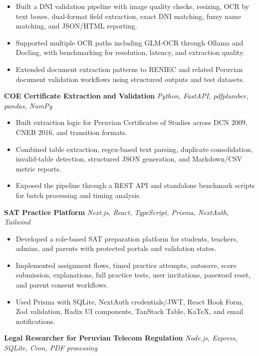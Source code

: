 \documentclass[10pt,letterpaper]{article}
\newcommand{\resumeProjectHeading}[2]{
  \textbf{#1} \hfill \textit{#2}
}
\begin{document}
\begin{itemize}
    \item Built a DNI validation pipeline with image quality checks, resizing, OCR by text boxes, dual-format field extraction, exact DNI matching, fuzzy name matching, and JSON/HTML reporting.
    \item Supported multiple OCR paths including GLM-OCR through Ollama and Docling, with benchmarking for resolution, latency, and extraction quality.
    \item Extended document extraction patterns to RENIEC and related Peruvian document validation workflows using structured outputs and test datasets.
\end{itemize}

\resumeProjectHeading
{COE Certificate Extraction and Validation}{Python, FastAPI, pdfplumber, pandas, NumPy}

\begin{itemize}
    \item Built extraction logic for Peruvian Certificates of Studies across DCN 2009, CNEB 2016, and transition formats.
    \item Combined table extraction, regex-based text parsing, duplicate consolidation, invalid-table detection, structured JSON generation, and Markdown/CSV metric reports.
    \item Exposed the pipeline through a REST API and standalone benchmark scripts for batch processing and timing analysis.
\end{itemize}

\resumeProjectHeading
{SAT Practice Platform}{Next.js, React, TypeScript, Prisma, NextAuth, Tailwind}

\begin{itemize}
    \item Developed a role-based SAT preparation platform for students, teachers, admins, and parents with protected portals and validation states.
    \item Implemented assignment flows, timed practice attempts, autosave, score submission, explanations, full practice tests, user invitations, password reset, and parent consent workflows.
    \item Used Prisma with SQLite, NextAuth credentials/JWT, React Hook Form, Zod validation, Radix UI components, TanStack Table, KaTeX, and email notifications.
\end{itemize}

\resumeProjectHeading
{Legal Researcher for Peruvian Telecom Regulation}{Node.js, Express, SQLite, Cron, PDF processing}
\end{document}
